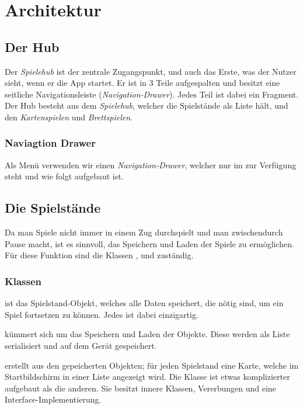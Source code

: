 \chapter{Architektur}

\section{Der Hub}
\sectionauthor{\leonard}

Der \emph{Spielehub} ist der zentrale Zugangspunkt, und auch das Erste, was der
Nutzer sieht, wenn er die App startet. Er ist in 3 Teile aufgespalten und
besitzt eine seitliche Navigationsleiste (\emph{Navigation-Drawer}). Jedes Teil
ist dabei ein Fragment. Der Hub besteht aus dem \emph{Spielehub}, welcher die
Spielstände als Liste hält, und den \emph{Kartenspielen} und
\emph{Brettspielen}.


\subsection{Naviagtion Drawer}

Als Menü verwenden wir einen \emph{Navigation-Drawer}, welcher nur im 
zur Verfügung steht und wie folgt aufgebaut ist.

\section{Die Spielstände}
\sectionauthor{\leonard}

Da man Spiele nicht immer in einem Zug durchspielt und man zwischendurch Pause
macht, ist es sinnvoll, das Speichern und Laden der Spiele zu ermöglichen. Für
diese Funktion sind die Klassen ,  und
 zuständig.

\subsection{Klassen}

 ist das Spielstand-Objekt, welches alle Daten speichert, die
nötig sind, um ein Spiel fortsetzen zu können. Jedes  ist dabei
einzigartig.

 kümmert sich um das Speichern und Laden der
 Objekte. Diese werden als Liste serialisiert und auf dem Gerät
gespeichert.

 erstellt aus den gepeicherten  Objekten;
für jeden Spielstand eine Karte, welche im Startbildschirm in einer Liste
angezeigt wird. Die Klasse ist etwas komplizierter aufgebaut als die anderen.
Sie besitzt innere Klassen, Vererbungen und eine Interface-Implementierung.


